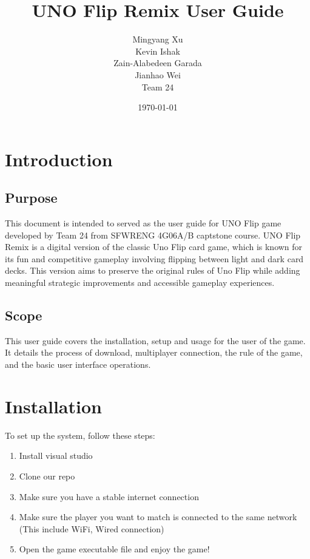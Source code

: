 \documentclass[12pt, titlepage]{article}
\begin{document}
\title{UNO Flip Remix User Guide}
\author{Mingyang Xu\\ Kevin Ishak\\ Zain-Alabedeen Garada\\ Jianhao Wei\\ Team 24}

\date{\today}

\maketitle


\tableofcontents

\listoffigures


\newpage


\section{Introduction}
\subsection{Purpose}
This document is intended to served as the user guide for UNO Flip game developed by Team 24 from SFWRENG 4G06A/B captstone course. UNO Flip Remix is a digital version of the classic Uno Flip card game, which is known for its fun and competitive gameplay involving flipping between light and dark card decks. This version aims to preserve the original rules of Uno Flip while adding meaningful strategic improvements and accessible gameplay experiences.

\subsection{Scope}
This user guide covers the installation, setup and usage for the user of the game. It details the process of download, multiplayer connection, the rule of the game, and the basic user interface operations.

\section{Installation}
To set up the system, follow these steps:
\begin{enumerate}
    \item Install visual studio
    \item Clone our repo
    \item Make sure you have a stable internet connection
    \item Make sure the player you want to match is connected to the same network (This include WiFi, Wired connection)
    \item Open the game executable file and enjoy the game!
\end{enumerate}
\end{document}
